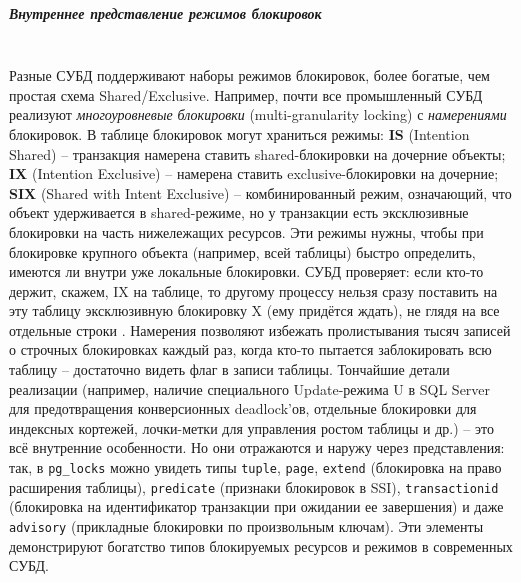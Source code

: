  \subparagraph{Внутреннее представление режимов блокировок} ~\\
 Разные СУБД поддерживают наборы режимов блокировок, более богатые, чем простая схема Shared/Exclusive. Например, почти все промышленный СУБД реализуют \textit{многоуровневые блокировки} (multi-granularity locking) с \textit{намерениями} блокировок. В таблице блокировок могут храниться режимы: \textbf{IS} (Intention Shared) – транзакция намерена ставить shared-блокировки на дочерние объекты; \textbf{IX} (Intention Exclusive) – намерена ставить exclusive-блокировки на дочерние; \textbf{SIX} (Shared with Intent Exclusive) – комбинированный режим, означающий, что объект удерживается в shared-режиме, но у транзакции есть эксклюзивные блокировки на часть нижележащих ресурсов. Эти режимы нужны, чтобы при блокировке крупного объекта (например, всей таблицы) быстро определить, имеются ли внутри уже локальные блокировки. СУБД проверяет: если кто-то держит, скажем, IX на таблице, то другому процессу нельзя сразу поставить на эту таблицу эксклюзивную блокировку X (ему придётся ждать), не глядя на все отдельные строки \autocite{sqlhack1}. Намерения позволяют избежать пролистывания тысяч записей о строчных блокировках каждый раз, когда кто-то пытается заблокировать всю таблицу – достаточно видеть флаг в записи таблицы. Тончайшие детали реализации (например, наличие специального Update-режима U в SQL Server для предотвращения конверсионных deadlock’ов, отдельные блокировки для индексных кортежей, лочки-метки для управления ростом таблицы и др.) – это всё внутренние особенности. Но они отражаются и наружу через представления: так, в \texttt{pg\_locks} можно увидеть типы \texttt{tuple}, \texttt{page}, \texttt{extend} (блокировка на право расширения таблицы), \texttt{predicate} (признаки блокировок в SSI), \texttt{transactionid} (блокировка на идентификатор транзакции при ожидании ее завершения) и даже \texttt{advisory} (прикладные блокировки по произвольным ключам). Эти элементы демонстрируют богатство типов блокируемых ресурсов и режимов в современных СУБД.

